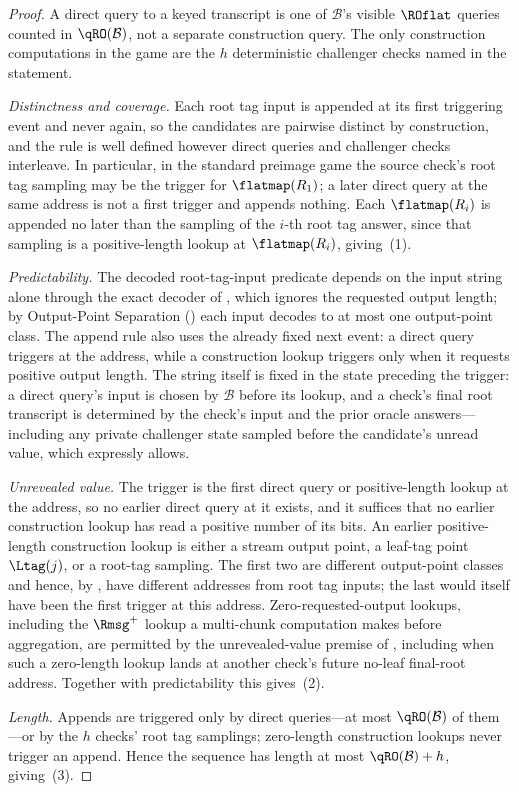 \begin{proof}
A direct query to a keyed transcript is one of $\mathcal{B}$'s visible
$\ROflat$ queries counted in $\qRO(\mathcal{B})$, not a separate
construction query. The only construction computations in the game are
the $h$ deterministic challenger checks named in the statement.

\emph{Distinctness and coverage.} Each root tag input is appended at its
first triggering event and never again, so the candidates are pairwise
distinct by construction, and the rule is well defined however direct
queries and challenger checks interleave. In particular, in the standard
preimage game the source check's root tag sampling may be the trigger for
$\flatmap(R_1)$; a later direct query at the same address is not a first
trigger and appends nothing. Each $\flatmap(R_i)$ is appended no later
than the sampling of the $i$-th root tag answer, since that sampling is a
positive-length lookup at $\flatmap(R_i)$, giving~(1).

\emph{Predictability.} The decoded root-tag-input predicate depends on
the input string alone through the exact decoder of
, which ignores the requested output length; by
Output-Point Separation () each input decodes to at
most one output-point class. The append rule also uses the already fixed
next event: a direct query triggers at the address, while a construction
lookup triggers only when it requests positive output length. The string
itself is fixed in the state preceding the trigger: a direct query's
input is chosen by $\mathcal{B}$ before its lookup, and a check's final
root transcript is determined by the check's input and the prior oracle
answers---including any private challenger state sampled before the
candidate's unread value, which  expressly
allows.

\emph{Unrevealed value.} The trigger is the first direct query or
positive-length lookup at the address, so no earlier direct query at it
exists, and it suffices that no earlier construction lookup has read a
positive number of its bits. An earlier positive-length construction
lookup is either a stream output point, a leaf-tag point $\Ltag(j)$, or a
root-tag sampling. The first two are different output-point classes and
hence, by , have different addresses from root tag
inputs; the last would itself have been the first trigger at this
address. Zero-requested-output lookups, including the $\Rmsg^+$ lookup a
multi-chunk computation makes before aggregation, are permitted by the
unrevealed-value premise of , including
when such a zero-length lookup lands at another check's future no-leaf
final-root address. Together with predictability this gives~(2).

\emph{Length.} Appends are triggered only by direct queries---at most
$\qRO(\mathcal{B})$ of them---or by the $h$ checks' root tag samplings;
zero-length construction lookups never trigger an append. Hence the
sequence has
length at most $\qRO(\mathcal{B}) + h$, giving~(3).
\end{proof}

